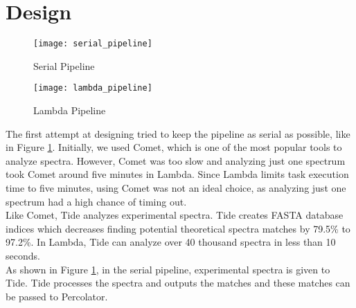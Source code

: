 \section{Design}
\begin{figure}
  \centering
  \texttt{[image: serial\_pipeline]}
  \caption{Serial Pipeline}
  \label{fig:serial_pipeline}
\end{figure}
\begin{figure}
  \centering
  \texttt{[image: lambda\_pipeline]}
  \caption{Lambda Pipeline}
  \label{fig:lambda_pipeline}
\end{figure}

The first attempt at designing \name tried to keep the pipeline as serial as possible, like in Figure \ref{fig:serial_pipeline}.
Initially, we used Comet, which is one of the most popular tools to analyze spectra\cite{comet}.
However, Comet was too slow and analyzing just one spectrum took Comet around five minutes in Lambda.
Since Lambda limits task execution time to five minutes, using Comet was not an ideal choice, as analyzing just one spectrum had a high chance of timing out.\\
\newline
Like Comet, Tide analyzes experimental spectra.
Tide creates FASTA database indices which decreases finding potential theoretical spectra matches by 79.5\% to 97.2\%\cite{crux}.
In Lambda, Tide can analyze over 40 thousand spectra in less than 10 seconds.\\
\newline
As shown in Figure \ref{fig:serial_pipeline}, in the serial pipeline, experimental spectra is given to Tide.
Tide processes the spectra and outputs the matches and these matches can be passed to Percolator.


